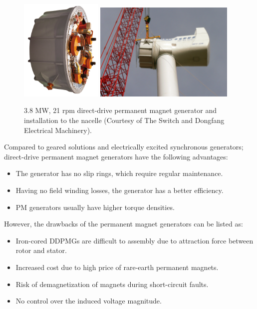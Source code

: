 \documentclass[a4paper, 11pt]{article} %
\begin{document}
  \begin{figure}
    \centering
    \includegraphics[width=0.35\textwidth]{switch}
    \hfill
    \includegraphics[width=0.6\textwidth]{switch_turbine}
    \caption{3.8 MW, 21 rpm direct-drive permanent magnet generator and installation to the nacelle (Courtesy of The Switch and Dongfang Electrical Machinery).} 
    \label{switch}
  \end{figure}

Compared to geared solutions and electrically excited synchronous generators; direct-drive permanent magnet generators have the following advantages:

\begin{itemize}
	\item The generator has no slip rings, which require regular maintenance.
	\item Having no field winding losses, the generator has a better efficiency.
	\item PM generators usually have higher torque densities.
\end{itemize}

However, the drawbacks of the permanent magnet generators can be listed as:

\begin{itemize}
	\item Iron-cored DDPMGs are difficult to assembly due to attraction force between rotor and stator.
	\item Increased cost due to high price of rare-earth permanent magnets.
	\item Risk of demagnetization of magnets during short-circuit faults.
	\item No control over the induced voltage magnitude.
\end{itemize}
\end{document}
